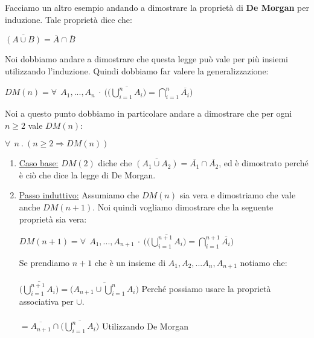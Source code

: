 \begin{example}[De Morgan]
    Facciamo un altro esempio andando a dimostrare la proprietà di \textbf{De Morgan} per induzione. Tale proprietà dice che:
    \begin{center}
        $\overline{(A \cup B)} = \overline{A} \cap \overline{B}$
    \end{center}
    Noi dobbiamo andare a dimostrare che questa legge può vale per più insiemi utilizzando l'induzione. Quindi dobbiamo far valere la generalizzazione:
    \begin{center}
        $DM(n) = \forall \: \: A_1, ..., A_n \: \cdot \: \Bigg(\overline{\Big( \bigcup\limits_{i=1}^{n} A_i \Big)} = \bigcap\limits_{i=1}^{n}\overline{A_i} \Bigg)$
    \end{center}
    Noi a questo punto dobbiamo in particolare andare a dimostrare che per ogni $n \geq 2$ vale $DM(n)$:
    \begin{center}
        $\forall\: \: n \: . \: (n \geq 2 \Longrightarrow DM(n))$
    \end{center}
    \begin{enumerate}
        \item \underline{Caso base:} $DM(2)$ diche che $\overline{(A_1 \cup A_2)} = \overline{A_1} \cap \overline{A_2}$, ed è dimostrato perché è ciò che dice la legge di De Morgan.
        \item \underline{Passo induttivo:} Assumiamo che $DM(n)$ sia vera e dimostriamo che vale anche $DM(n+1)$. Noi quindi vogliamo dimostrare che la seguente proprietà sia vera:
        \begin{center}
            $DM(n+1) = \forall \: \: A_1, ..., A_{n+1} \: \cdot \: \Bigg(\overline{\Big( \bigcup\limits_{i=1}^{n+1} A_i \Big)} = \bigcap\limits_{i=1}^{n+1}\overline{A_i} \Bigg)$
        \end{center}
        Se prendiamo $n+1$ che è un insieme di $A_1, A_2, ...A_n, A_{n+1}$ notiamo che:\\ \\
        $\overline{\Big( \bigcup\limits_{i=1}^{n+1} A_i \Big)} = \overline{\Big(A_{n+1} \cup \bigcup\limits_{i=1}^{n} A_i \Big)}$ \hspace{.5cm} Perché possiamo usare la proprietà associativa per $\cup$.\\ \\
        $= \overline{A_{n+1}} \cap \overline{\Big(\bigcup\limits_{i=1}^{n} A_i \Big)}$ \hspace{.5cm} Utilizzando De Morgan\\\\

\end{enumerate}
\end{example}
